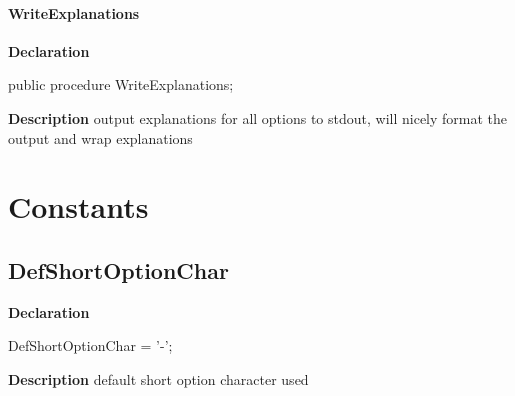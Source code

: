 \documentclass{report}
\newif\ifpdf
\begin{document}
\paragraph*{WriteExplanations}\hspace*{\fill}

\label{PasDoc_OptionParser.TOptionParser-WriteExplanations}
\begin{list}{}{
\setlength{\itemindent}{0cm}
\setlength{\listparindent}{0cm}
\setlength{\leftmargin}{\evensidemargin}
\addtolength{\leftmargin}{\tmplength}
\settowidth{\labelsep}{X}
\addtolength{\leftmargin}{\labelsep}
\setlength{\labelwidth}{\tmplength}
}
\item[\textbf{Declaration}\hfill]
\ifpdf
\begin{flushleft}
\fi
\begin{ttfamily}
public procedure WriteExplanations;\end{ttfamily}

\ifpdf
\end{flushleft}
\fi

\par
\item[\textbf{Description}]
output explanations for all options to stdout, will nicely format the output and wrap explanations

\end{list}
\section{Constants}
\ifpdf
\subsection*{\large{\textbf{DefShortOptionChar}}\normalsize\hspace{1ex}\hrulefill}
\else
\subsection*{DefShortOptionChar}
\fi
\label{PasDoc_OptionParser-DefShortOptionChar}
\begin{list}{}{
\setlength{\itemindent}{0cm}
\setlength{\listparindent}{0cm}
\setlength{\leftmargin}{\evensidemargin}
\addtolength{\leftmargin}{\tmplength}
\settowidth{\labelsep}{X}
\addtolength{\leftmargin}{\labelsep}
\setlength{\labelwidth}{\tmplength}
}
\item[\textbf{Declaration}\hfill]
\ifpdf
\begin{flushleft}
\fi
\begin{ttfamily}
DefShortOptionChar = '-';\end{ttfamily}

\ifpdf
\end{flushleft}
\fi

\par
\item[\textbf{Description}]
default short option character used

\end{list}
\ifpdf
\end{document}
